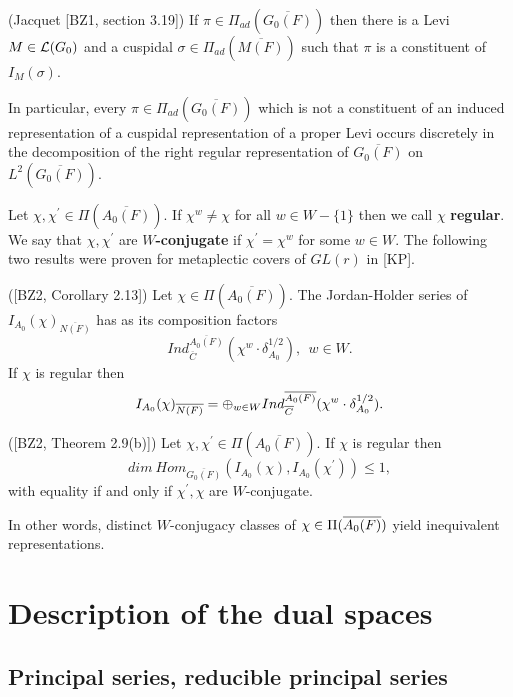 \begin{proposition}
(Jacquet [BZ1, section 3.19]) If $\pi \in \Pi _{ad}(\overline{G_0(F)})$ then
  there is a Levi $M\in {\cal L}(G_0)$ and a cuspidal
  $\sigma \in \Pi _{ad}(\overline{M(F)})$
  such that $\pi $ is a constituent of $I_M(\sigma )$.
\end{proposition}

In particular, every $\pi \in \Pi _{ad}(\overline{G_0(F)})$ which is not a
constituent of an induced representation of a cuspidal representation of a
proper Levi occurs discretely in the decomposition of the right regular
representation of $\overline{G_0(F)}$ on $L^2(\overline{G_0(F)})$.

Let $\chi ,\chi ^{\prime }\in \Pi (\overline{A_0(F)})$. If $\chi ^w\not
=\chi $ for all $w\in W-\{1\}$ then we call $\chi $ {\bf regular}. We say
that $\chi ,\chi ^{\prime }$ are {\bf $W$-conjugate} if $\chi ^{\prime
}=\chi ^w$ for some $w\in W$. The following two results were proven for
metaplectic covers of $GL(r)$ in [KP].

\begin{lemma}
([BZ2, Corollary 2.13]) Let $\chi \in \Pi (\overline{A_0(F)})$. The
Jordan-Holder series of $I_{A_0}(\chi )_{\overline{N(F)}}$ has as its
composition factors 
\[
Ind_{\overline{C}}^{\overline{A_0(F)}}(\chi ^w\cdot \delta _{A_0}^{1/2}),\ \
w\in W.
\]
If $\chi $ is regular then 
\[
I_{A_0}(\chi )_{\overline{N(F)}}=\oplus _{w\in W}Ind_{\overline{C}}^{%
\overline{A_0(F)}}(\chi ^w\cdot \delta _{A_0}^{1/2}).
\]
\end{lemma}

\begin{proposition}
([BZ2, Theorem 2.9(b)]) Let $\chi ,\chi ^{\prime }\in \Pi (\overline{A_0(F)})
$. If $\chi $ is regular then 
\[
dim\ Hom_{\overline{G_0(F)}}(I_{A_0}(\chi ),I_{A_0}(\chi ^{\prime }))\leq 1,
\]
with equality if and only if $\chi ^{\prime },\chi $ are $W$-conjugate.
\end{proposition}

In other words, distinct $W$-conjugacy classes of $\chi \in \Pi (\overline{%
A_0(F)})$ yield inequivalent representations.

\section{Description of the dual spaces}

\subsection{Principal series, reducible principal series}


